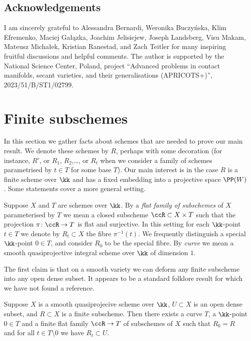 \documentclass[12pt,a4paper]{article}
\begin{document}
\subsection*{Acknowledgements}
I am sincerely grateful to
Alessandra Bernardi,
Weronika Buczy{\'n}ska,
Klim Efremenko,
Maciej Ga{\l}{\k a}zka,
Joachim Jelisiejew,
Joseph Landsberg,
Visu Makam,
Mateusz Micha{\l}ek,
Kristian Ranestad, and
Zach Teitler
  for many inspiring fruitful discussions and helpful comments.
The author is supported by the National Science Center, Poland, project ``Advanced problems in contact manifolds, secant varieties, and their generalisations (APRICOTS+)'', 2023/51/B/ST1/02799.

\section{Finite subschemes}\label{sec_finite_schemes}

In this section we gather facts about schemes that are needed to prove our main result.
We denote these schemes by $R$, perhaps with some decoration (for instance, $R'$, or $R_1$, $R_2$,\dots, or $R_t$ when we consider a family of schemes parametrised by $t\in T$ for some base $T$).
Our main interest is in the case $R$ is a finite scheme over $\kk$ and has a fixed embedding into a projective space $\PP(W)$. Some statements cover a more general setting.

Suppose $X$ and $T$ are schemes over $\kk$.
By a \emph{flat family of subschemes} of $X$ parameterised by $T$ we mean a closed subscheme $\ccR \subset X\times T$ such that the projection $\pi\colon \ccR \to T$ is flat and surjective.
In this setting for each $\kk$-point $t\in T$
we denote by $R_t\subset X$ the fibre $\pi^{-1}(t)$.
We frequently distinguish a special $\kk$-point $0\in T$, and consider $R_0$ to be the special fibre.
By \emph{curve} we mean a smooth quasiprojective integral scheme over $\kk$ of dimension $1$.

The first claim is that on a smooth variety we can deform any finite subscheme into any open dense subset.
It appears to be a standard folklore result for which we have not found a reference.


\begin{prop}
   \label{prop_moving_scheme_into_generic_position}
   Suppose $X$ is a smooth quasiprojecive scheme over $\kk$, $U\subset X$ is an open dense subset,
   and $R\subset X$ is a finite subscheme.
   Then there exists a curve $T$, a $\kk$-point $0\in T$ and a finite flat family $\ccR \to T$ of subschemes of $X$ such that $R_0=R$ and for all $t\in T\setminus {0}$ we have $R_t\subset U$.
\end{prop}
\end{document}
